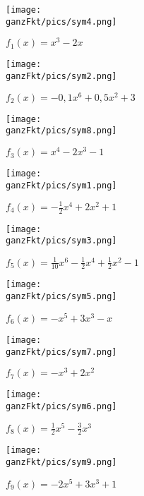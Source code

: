 \begin{minipage}{\textwidth}
	\begin{minipage}{0.33\textwidth}\centering
		\texttt{[image: \\ganzFkt/pics/sym4.png]}

		\(f_1(x)=x^3-2x\)
	\end{minipage}%
	\begin{minipage}{0.33\textwidth}\centering
		\texttt{[image: \\ganzFkt/pics/sym2.png]}

		\(f_2(x)=-0,1x^6+0,5x^2+3\)
	\end{minipage}%
	\begin{minipage}{0.33\textwidth}\centering
		\texttt{[image: \\ganzFkt/pics/sym8.png]}

		\(f_3(x)=x^4-2x^3-1\)
	\end{minipage}%

	\medskip

	\begin{minipage}{0.33\textwidth}\centering
		\texttt{[image: \\ganzFkt/pics/sym1.png]}

		\(f_4(x)= -\frac{1}{2}x^4+2x^2+1\)
	\end{minipage}%
	\begin{minipage}{0.33\textwidth}\centering
		\texttt{[image: \\ganzFkt/pics/sym3.png]}

		\(f_5(x)=\frac{1}{10}x^6-\frac{1}{2}x^4+\frac{1}{2}x^2-1\)
	\end{minipage}%
	\begin{minipage}{0.33\textwidth}\centering
		\texttt{[image: \\ganzFkt/pics/sym5.png]}

		\(f_6(x)=-x^5+3x^3-x\)
	\end{minipage}%

	\medskip

	\begin{minipage}{0.33\textwidth}\centering
		\texttt{[image: \\ganzFkt/pics/sym7.png]}

		\(f_7(x)=-x^3+2x^2\)
	\end{minipage}%
	\begin{minipage}{0.33\textwidth}\centering
		\texttt{[image: \\ganzFkt/pics/sym6.png]}

		\(f_8(x)=\frac{1}{2}x^5-\frac{3}{2}x^3\)
	\end{minipage}%
	\begin{minipage}{0.33\textwidth}\centering
		\texttt{[image: \\ganzFkt/pics/sym9.png]}

		\(f_9(x)=-2x^5+3x^3+1\)
	\end{minipage}%
\end{minipage}


